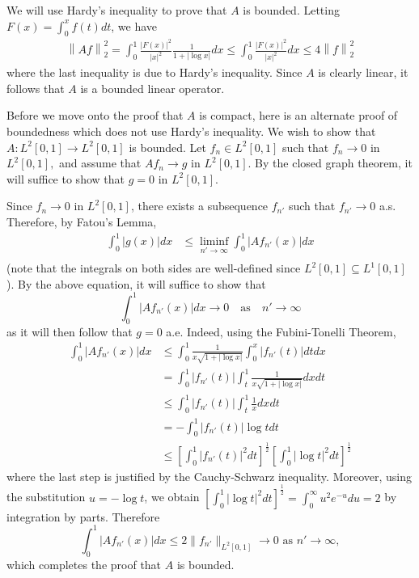 \documentclass{exam}
\theoremstyle{problemstyle}
\newcommand{\norm}[1]{\left\lVert#1\right\rVert} %
\newcommand{\1}[1]{\textbf{1}_{\left[#1\right]}} %
\begin{document}
\begin{questions}
\begin{solution}
  We will use Hardy's inequality to prove that $A$ is bounded. Letting $F(x) = \int_{0}^{x}f(t)dt$, we have
  \begin{align*}
    \norm{Af}_{2}^{2} = \int_{0}^{1}\frac{|F(x)|^{2}}{|x|^{2}} \frac{1}{1+|\log x|}dx \leq \int_{0}^{1}\frac{|F(x)|^{2}}{|x|^{2}}dx \leq 4 \norm{f}^{2}_{2}
  \end{align*}
  where the last inequality is due to Hardy's inequality. Since $A$ is clearly linear, it follows that $A$ is a bounded linear operator.
  
  Before we move onto the proof that $A$ is compact, here is an alternate proof of boundedness which does not use Hardy's inequality. We wish to show that $A:L^{2}[0,1]\to L^{2}[0,1]$ is
bounded. Let $f_{n}\in L^{2}[0,1]$ such that $f_{n}\to 0$ in $L^{2}[0,1],$ and
assume that $Af_{n}\to g$ in $L^{2}[0,1].$ By the closed graph theorem, it will
suffice to show that $g=0$ in $L^{2}[0,1].$  


Since $f_{n}\to 0$ in $L^{2}[0,1]$, there exists a subsequence $f_{n'}$ such
that $f_{n'}\to 0$ a.s. Therefore, by Fatou's Lemma,
\begin{align*}
  \int_{0}^{1}|g(x)|dx 
  &\leq \liminf_{n'\to\infty}\int_{0}^{1}|Af_{n'}(x)|dx \\
\end{align*}
(note that the integrals on both sides are well-defined since
$L^{2}[0,1]\subseteq L^{1}[0,1]$).
By the above equation, it will suffice to show that
\begin{equation*}
  \int_{0}^{1}|Af_{n'}(x)|dx \to 0
  \quad \text{as} \quad n'\to \infty
\end{equation*}
as it will then follow that $g=0$ a.e. Indeed, using the Fubini-Tonelli Theorem,
\begin{align*}
  \int_{0}^{1}|Af_{n'}(x)|dx
  &\leq \int_{0}^{1}\frac{1}{x \sqrt{1+|\log x|}} \int_{0}^{x}|f_{n'}(t)|dt dx\\ 
  &= \int_{0}^{1}|f_{n'}(t)| \int_{t}^{1}\frac{1}{x \sqrt{1+|\log x|}}  dx dt\\
  &\leq \int_{0}^{1}|f_{n'}(t)| \int_{t}^{1}\frac{1}{x}dxdt\\  
  &= -\int_{0}^{1}|f_{n'}(t)| \log t dt\\
  &\leq \left[ \int_{0}^{1}|f_{n'}(t)|^{2}dt  \right]^{\frac{1}{2}}\left[ \int_{0}^{1} |\log t|^{2} dt \right]^{\frac{1}{2}}
\end{align*}
where the last step is justified by the Cauchy-Schwarz inequality. Moreover,
using the substitution $u = -\log t$, we obtain
$\left[ \int_{0}^{1} |\log t|^{2} dt \right]^{\frac{1}{2}} =
\int_{0}^{\infty}u^{2}e^{-u}du=2$ by integration by parts. Therefore
\begin{equation*}
  \int_{0}^{1}|Af_{n'}(x)|dx \leq  2 \|f_{n'}\|_{L^{2}[0,1]} \to 0 \text{ as }n'\to \infty,
\end{equation*}
which completes the proof that $A$ is bounded.




\end{solution}
\end{questions}
\end{document}
